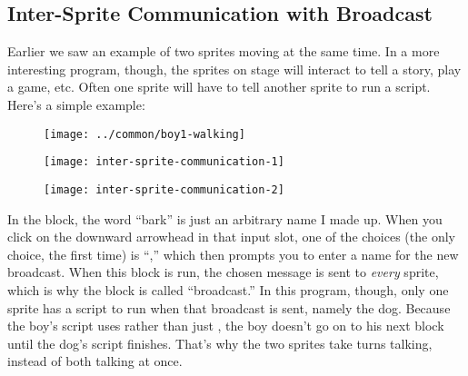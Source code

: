 \documentclass{report}
\begin{document}
\subsection{Inter-Sprite Communication with Broadcast}

Earlier we saw an example of two sprites moving at the same time. In a more interesting program, though, the sprites on stage will interact to tell a story, play a game, etc. Often one sprite will have to tell another sprite to run a script. Here's a simple example:

\begin{figure}[H]
\begin{minipage}{0.5\textwidth}
\centering
\texttt{[image: ../common/boy1-walking]}
\end{minipage}%
\begin{minipage}{0.5\textwidth}
\centering
{}
\end{minipage}

\vspace{3ex}
\begin{minipage}[t]{0.5\textwidth}
\centering
\vspace{0pt} %
\texttt{[image: inter-sprite-communication-1]}
\end{minipage}%
\begin{minipage}[t]{0.5\textwidth}
\centering
\vspace{0pt} %
\texttt{[image: inter-sprite-communication-2]}
\end{minipage}
\end{figure}

In the  block, the word ``bark'' is just an arbitrary name I made up. When you click on the downward arrowhead in that input slot, one of the choices (the only choice, the first time) is ``,'' which then prompts you to enter a name for the new broadcast. When this block is run, the chosen message is sent to \emph{every} sprite, which is why the block is called ``broadcast.'' In this program, though, only one sprite has a script to run when that broadcast is sent, namely the dog. Because the boy's script uses  rather than just , the boy doesn't go on to his next  block until the dog's script finishes. That's why the two sprites take turns talking, instead of both talking at once.
\end{document}
